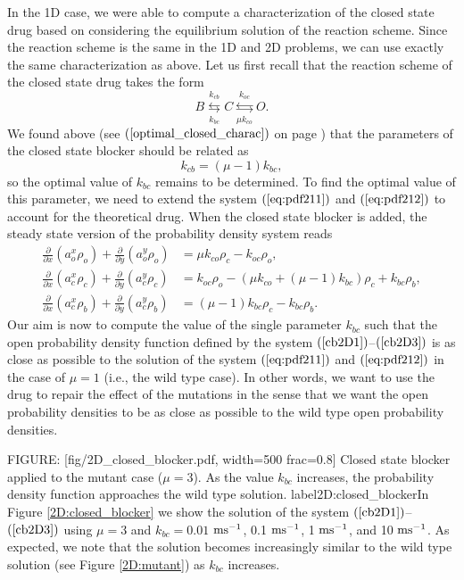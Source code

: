 {In the 1D case, we were able to compute a characterization of the closed state
drug based on considering the equilibrium solution of the reaction scheme.
Since the reaction scheme is the same in the 1D and 2D problems, we can
use exactly the same characterization as above. Let us first recall that the
reaction scheme of the closed state drug takes the form
\[
B\underset{k_{bc}}{\overset{k_{cb}}{\leftrightarrows}}C\underset{\mu k_{co}
}{\overset{k_{oc}}{\leftrightarrows}}O.
\]
We found above (see $(\ref{optimal_closed_charac})$ on page \pageref{optimal_closed_charac}) that the
parameters of the closed state blocker should be related as
\begin{equation}
k_{cb}=(\mu-1)k_{bc},\label{characterize2D}
\end{equation}
so the optimal value of $k_{bc}$ remains to be determined. To find the
optimal value of this parameter, we need to extend the system 
$(\ref{eq:pdf211})$ and $(\ref{eq:pdf212})$ to account for the theoretical drug. When the closed state blocker 
is added,
the steady state version of the probability density system reads
\begin{align}
\frac{\partial}{\partial x}\left(  a_{o}^{x}\rho_{o}\right)  +\frac{\partial
}{\partial y}\left(  a_{o}^{y}\rho_{o}\right)   &  =\mu k_{co}\rho_{c}
-k_{oc}\rho_{o},\label{cb2D1}\\
\frac{\partial}{\partial x}\left(  a_{c}^{x}\rho_{c}\right)  +\frac{\partial
}{\partial y}\left(  a_{c}^{y}\rho_{c}\right)   &  =k_{oc}\rho_{o}-\left(  \mu
k_{co}+\left(  \mu-1\right)  k_{bc}\right)  \rho_{c}+k_{bc}\rho_{b}
,\label{cb2D2}\\
\frac{\partial}{\partial x}\left(  a_{c}^{x}\rho_{b}\right)  +\frac{\partial
}{\partial y}\left(  a_{c}^{y}\rho_{b}\right)   &  =\left(  \mu-1\right)
k_{bc}\rho_{c}-k_{bc}\rho_{b}.\label{cb2D3}
\end{align}
Our aim is now to compute the value of the single parameter $k_{bc}$ such that
the open probability density function defined by the system $(\ref{cb2D1})$--$(\ref{cb2D3})$ is as close as
possible to the solution of the system $(\ref{eq:pdf211})$ and $(\ref{eq:pdf212})$ in
the case of $\mu=1$ (i.e., the wild type case). In other words, we want to use the drug to repair the effect of
the mutations in the sense that we want the open probability densities to be as close
as possible to the wild type open probability densities.

FIGURE: [fig/2D_closed_blocker.pdf, width=500 frac=0.8] Closed state blocker applied to the mutant case ($\mu=3$). As the value
$k_{bc}$ increases, the probability density function approaches the wild type solution.  label{2D:closed_blocker}In Figure \ref{2D:closed_blocker} we show 
the solution of the system $(\ref{cb2D1})$--$(\ref{cb2D3})$ using $\mu=3$ and
$k_{bc}=0.01$ $\rm{ms^{-1}}$, 0.1 $\rm{ms^{-1}}$, 1 $\rm{ms^{-1}}$, and 10 $\rm{ms^{-1}}$. As expected, we note that the solution becomes increasingly similar to the wild type solution
(see Figure \ref{2D:mutant}) as $k_{bc}$ increases. 

}
